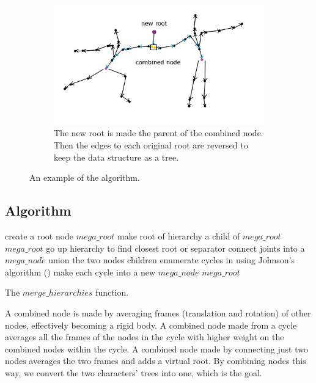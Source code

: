\begin{figure}[H]
\begin{subfigure}[b!]{0.6\textwidth}
                \includegraphics[width=\linewidth]{img/algorithm4}
                \caption{The new root is made the parent of the combined node. Then the edges to each original root are reversed to keep the data structure as a tree.}
        \end{subfigure}
    \caption{An example of the algorithm.}
	\label{fig:example}
\end{figure}

\subsection{Algorithm}
\begin{algorithm}[H]
 {
  create a root node $mega\_root$\;
  {
   make root of hierarchy a child of $mega\_root$\;
   \Return $mega\_root$\;
  }
 }
 {
  {
   go up hierarchy to find closest root or separator\;
   {
    connect joints into a $mega\_node$\;
    union the two nodes children\;
   }
  }
 }
 enumerate cycles in using Johnson's algorithm (\citep{johnson1975finding})\;
 make each cycle into a new $mega\_node$\;
 \Return $mega\_root$\;
 
 \caption{The $merge\_hierarchies$ function.}
\end{algorithm}

A combined node is made by averaging frames (translation and rotation) of other nodes, effectively becoming a rigid body. A combined node made from a cycle averages all the frames of the nodes in the cycle with higher weight on the combined nodes within the cycle. A combined node made by connecting just two nodes averages the two frames and adds a virtual root. By combining nodes this way, we convert the two characters' trees into one, which is the goal.

